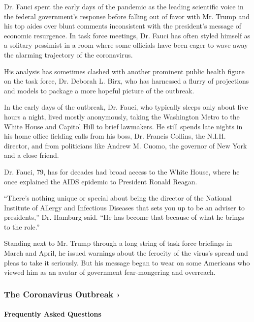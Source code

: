 Dr. Fauci spent the early days of the pandemic as the leading scientific
voice in the federal government's response before falling out of favor
with Mr. Trump and his top aides over blunt comments inconsistent with
the president's message of economic resurgence. In task force meetings,
Dr. Fauci has often styled himself as a solitary pessimist in a room
where some officials have been eager to wave away the alarming
trajectory of the coronavirus.

His analysis has sometimes clashed with another prominent public health
figure on the task force, Dr. Deborah L. Birx, who has harnessed a
flurry of projections and models to package a more hopeful picture of
the outbreak.

In the early days of the outbreak, Dr. Fauci, who typically sleeps only
about five hours a night, lived mostly anonymously, taking the
Washington Metro to the White House and Capitol Hill to brief lawmakers.
He still spends late nights in his home office fielding calls from his
boss, Dr. Francis Collins, the N.I.H. director, and from politicians
like Andrew M. Cuomo, the governor of New York and a close friend.

Dr. Fauci, 79, has for decades had broad access to the White House,
where he once explained the AIDS epidemic to President Ronald Reagan.

``There's nothing unique or special about being the director of the
National Institute of Allergy and Infectious Diseases that sets you up
to be an adviser to presidents,'' Dr. Hamburg said. ``He has become that
because of what he brings to the role.''

Standing next to Mr. Trump through a long string of task force briefings
in March and April, he issued warnings about the ferocity of the virus's
spread and pleas to take it seriously. But his message began to wear on
some Americans who viewed him as an avatar of government fear-mongering
and overreach.

\href{https://www.nytimes.com/news-event/coronavirus?action=click\&pgtype=Article\&state=default\&region=MAIN_CONTENT_3\&context=storylines_faq}{}

\hypertarget{the-coronavirus-outbreak-}{%
\subsubsection{The Coronavirus Outbreak
›}\label{the-coronavirus-outbreak-}}

\hypertarget{frequently-asked-questions}{%
\paragraph{Frequently Asked
Questions}\label{frequently-asked-questions}}


